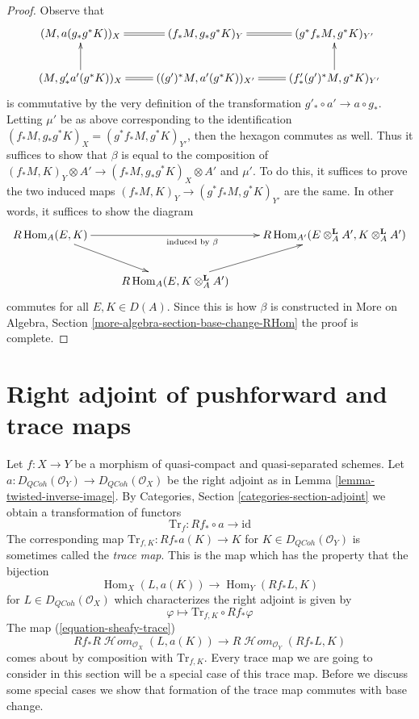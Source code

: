 \documentclass{stacks-project}
\theoremstyle{plain}
\theoremstyle{definition}
\theoremstyle{remark}
\numberwithin{equation}{subsection}
\def\Hom{\mathop{\mathrm{Hom}}\nolimits}
\def\SheafHom{\mathop{\mathcal{H}\!\mathit{om}}\nolimits}
\def\QCoh{\mathit{QCoh}}
\begin{document}
\begin{proof}
\medskip\noindent
Observe that
$$
\xymatrix{
(M, a(g_*g^*K))_X &
(f_*M, g_* g^*K)_Y \ar@{=}[l] &
(g^*f_*M, g^*K)_{Y'} \ar@{=}[l] \\
(M, g'_* a'(g^*K))_X \ar[u] &
((g')^*M, a'(g^*K))_{X'} \ar@{=}[l] &
(f'_*(g')^*M, g^*K)_{Y'} \ar@{=}[l] \ar[u]
}
$$
is commutative by the very definition of the transformation
$g'_* \circ a' \to a \circ g_*$. Letting $\mu'$ be as above
corresponding to the identification
$(f_*M, g_*g^*K)_X = (g^*f_*M, g^*K)_{Y'}$, then the
hexagon commutes as well. Thus it suffices to show that
$\beta$ is equal to the composition of
$(f_*M, K)_Y \otimes A' \to (f_*M, g_*g^*K)_X \otimes A'$
and $\mu'$. To do this, it suffices to prove the two induced maps
$(f_*M, K)_Y \to (g^*f_*M, g^*K)_{Y'}$ are the same.
In other words, it suffices to show the diagram
$$
\xymatrix{
R\Hom_A(E, K) \ar[rr]_{\text{induced by }\beta} \ar[rd] & &
R\Hom_{A'}(E \otimes_A^\mathbf{L} A', K \otimes_A^\mathbf{L} A') \\
& R\Hom_A(E, K \otimes_A^\mathbf{L} A') \ar[ru]
}
$$
commutes for all $E, K \in D(A)$. Since this is how $\beta$ is constructed in
More on Algebra, Section \ref{more-algebra-section-base-change-RHom}
the proof is complete.
\end{proof}








\section{Right adjoint of pushforward and trace maps}
\label{section-trace}

\noindent
Let $f : X \to Y$ be a morphism of quasi-compact and quasi-separated
schemes. Let $a : D_\QCoh(\mathcal{O}_Y) \to D_\QCoh(\mathcal{O}_X)$
be the right adjoint as in Lemma \ref{lemma-twisted-inverse-image}. By
Categories, Section \ref{categories-section-adjoint} we obtain a
transformation of functors
$$
\text{Tr}_f : Rf_* \circ a \longrightarrow \text{id}
$$
The corresponding map $\text{Tr}_{f, K} : Rf_*a(K) \longrightarrow K$
for $K \in D_\QCoh(\mathcal{O}_Y)$ is sometimes called the {\it trace map}.
This is the map which has the property that the bijection
$$
\Hom_X(L, a(K)) \longrightarrow \Hom_Y(Rf_*L, K)
$$
for $L \in D_\QCoh(\mathcal{O}_X)$ which characterizes the right adjoint
is given by
$$
\varphi \longmapsto \text{Tr}_{f, K} \circ Rf_*\varphi
$$
The map (\ref{equation-sheafy-trace})
$$
Rf_*R\SheafHom_{\mathcal{O}_X}(L, a(K))
\longrightarrow
R\SheafHom_{\mathcal{O}_Y}(Rf_*L, K)
$$
comes about by composition with $\text{Tr}_{f, K}$.
Every trace map we are going to consider in this section will be a
special case of this trace map. Before we discuss some special cases
we show that formation of the trace map commutes with base change.
\end{document}
